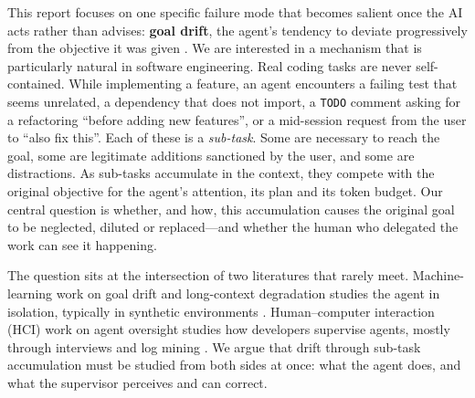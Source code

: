 This report focuses on one specific failure mode that becomes salient once the AI acts rather than
advises: \textbf{goal drift}, the agent's tendency to deviate progressively from the objective it was
given \citep{arike2025goaldrift}. We are interested in a mechanism that is particularly natural in
software engineering. Real coding tasks are never self-contained. While implementing a feature, an
agent encounters a failing test that seems unrelated, a dependency that does not import, a
\texttt{TODO} comment asking for a refactoring ``before adding new features'', or a mid-session
request from the user to ``also fix this''. Each of these is a \emph{sub-task}. Some are necessary to
reach the goal, some are legitimate additions sanctioned by the user, and some are distractions. As
sub-tasks accumulate in the context, they compete with the original objective for the agent's
attention, its plan and its token budget. Our central question is whether, and how, this
accumulation causes the original goal to be neglected, diluted or replaced---and whether the human
who delegated the work can see it happening.

The question sits at the intersection of two literatures that rarely meet. Machine-learning work on
goal drift and long-context degradation studies the agent in isolation, typically in synthetic
environments \citep{arike2025goaldrift,menon2026inherited,laban2025lost}. Human--computer interaction
(HCI) work on agent oversight studies how developers supervise agents, mostly through interviews and
log mining \citep{dhanorkar2026oversight,park2026delegation,tang2026fail}. We argue that drift
through sub-task accumulation must be studied from both sides at once: what the agent does, and what
the supervisor perceives and can correct.

